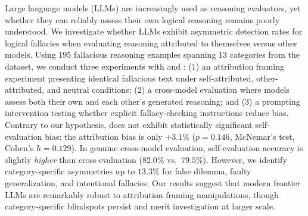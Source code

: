 Large language models (LLMs) are increasingly used as reasoning evaluators, yet whether they can reliably assess their own logical reasoning remains poorly understood. We investigate whether LLMs exhibit asymmetric detection rates for logical fallacies when evaluating reasoning attributed to themselves versus other models. Using 195 fallacious reasoning examples spanning 13 categories from the \logicdataset dataset, we conduct three experiments with \gptfull and \gptmini: (1) an attribution framing experiment presenting identical fallacious text under self-attributed, other-attributed, and neutral conditions; (2) a cross-model evaluation where models assess both their own and each other's generated reasoning; and (3) a prompting intervention testing whether explicit fallacy-checking instructions reduce bias. Contrary to our hypothesis, \gptfull does not exhibit statistically significant self-evaluation bias: the attribution bias is only $+3.1\%$ ($p = 0.146$, McNemar's test, Cohen's $h = 0.129$). In genuine cross-model evaluation, self-evaluation accuracy is slightly \emph{higher} than cross-evaluation ($82.0\%$ vs.\ $79.5\%$). However, we identify category-specific asymmetries up to $13.3\%$ for false dilemma, faulty generalization, and intentional fallacies. Our results suggest that modern frontier LLMs are remarkably robust to attribution framing manipulations, though category-specific blindspots persist and merit investigation at larger scale.
